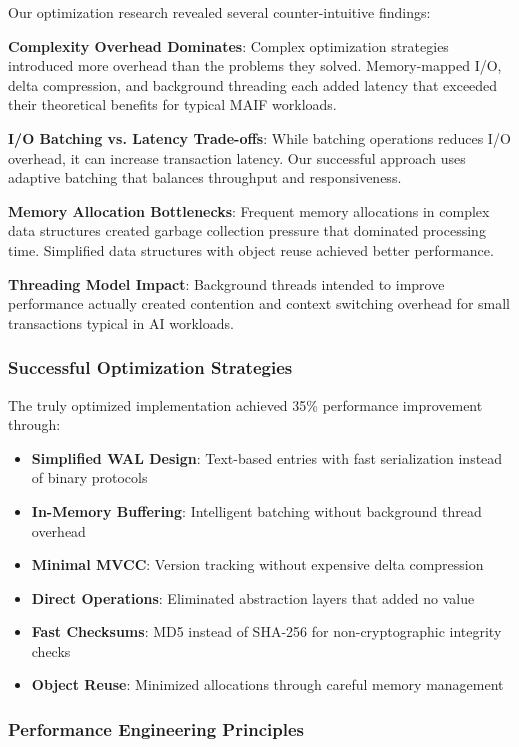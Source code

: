 \documentclass[conference]{IEEEtran}
\begin{document}
\begin{itemize}[leftmargin=*]
Our optimization research revealed several counter-intuitive findings:

\textbf{Complexity Overhead Dominates}:
Complex optimization strategies introduced more overhead than the problems they solved. Memory-mapped I/O, delta compression, and background threading each added latency that exceeded their theoretical benefits for typical MAIF workloads.

\textbf{I/O Batching vs. Latency Trade-offs}:
While batching operations reduces I/O overhead, it can increase transaction latency. Our successful approach uses adaptive batching that balances throughput and responsiveness.

\textbf{Memory Allocation Bottlenecks}:
Frequent memory allocations in complex data structures created garbage collection pressure that dominated processing time. Simplified data structures with object reuse achieved better performance.

\textbf{Threading Model Impact}:
Background threads intended to improve performance actually created contention and context switching overhead for small transactions typical in AI workloads.

\subsubsection{Successful Optimization Strategies}

The truly optimized implementation achieved 35\% performance improvement through:

\begin{itemize}[leftmargin=*]
\item \textbf{Simplified WAL Design}: Text-based entries with fast serialization instead of binary protocols
\item \textbf{In-Memory Buffering}: Intelligent batching without background thread overhead
\item \textbf{Minimal MVCC}: Version tracking without expensive delta compression
\item \textbf{Direct Operations}: Eliminated abstraction layers that added no value
\item \textbf{Fast Checksums}: MD5 instead of SHA-256 for non-cryptographic integrity checks
\item \textbf{Object Reuse}: Minimized allocations through careful memory management
\end{itemize}

\subsubsection{Performance Engineering Principles}


\end{itemize}
\end{document}
